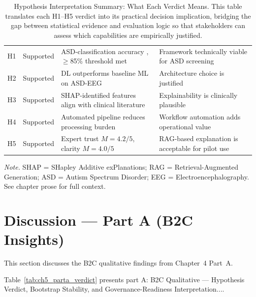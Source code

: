 {\tablestripes\tablefontsize
{}
\begin{xltabular}{\textwidth}{@{} >{\raggedright\arraybackslash}p{0.6cm} >{\raggedright\arraybackslash}p{1.5cm} L L @{}}
\caption[Hypothesis Interpretation Summary: What Each Verdict Means]{Hypothesis Interpretation Summary: What Each Verdict Means. This table translates each H1--H5 verdict into its practical decision implication, bridging the gap between statistical evidence and evaluation logic so that stakeholders can assess which capabilities are empirically justified.}\label{tab:hypothesis_interpretation} \\
\toprule
{} &  &  &  \\
\midrule
\endfirsthead
\endhead
\bottomrule
\endlastfoot
H1 & Supported & ASD-classification accuracy \asdacc{}, $\geq$85\% threshold met & Framework technically viable for ASD screening \\
H2 & Supported & DL outperforms baseline ML on ASD-EEG & Architecture choice is justified \\
H3 & Supported & SHAP-identified features align with clinical literature & Explainability is clinically plausible \\
H4 & Supported & Automated pipeline reduces processing burden & Workflow automation adds operational value \\
H5 & Supported & Expert trust $M = 4.2/5$, clarity $M = 4.0/5$ & RAG-based explanation is acceptable for pilot use \\
\end{xltabular}}
\vspace{0.3em}\noindent\textit{Note.} SHAP = SHapley Additive exPlanations; RAG = Retrieval-Augmented Generation; ASD = Autism Spectrum Disorder; EEG = Electroencephalography. See chapter prose for full context.

\section{Discussion --- Part A (B2C Insights)}
\label{sec:ch5_trust}
\label{sec:ch5_governance}

This section discusses the B2C qualitative findings from Chapter~4 Part~A.

\noindent Table~\ref{tab:ch5_parta_verdict} presents part A: B2C Qualitative --- Hypothesis Verdict, Bootstrap Stability, and Governance-Readiness Interpretation....

